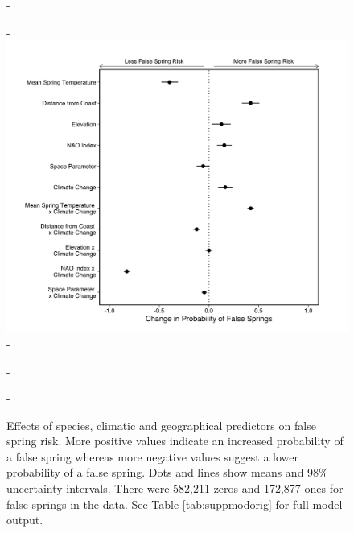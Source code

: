 \documentclass{article}\usepackage[]{graphicx}\usepackage[]{color}
\begin{document}
  
{\begin{figure} [H]
  -\begin{center}
  -\includegraphics[width=12cm]{..//analyses/figures/model_output_98_orig.png}
  -\caption{Effects of species, climatic and geographical predictors on false spring risk. More positive values indicate an increased probability of a false spring whereas more negative values suggest a lower probability of a false spring. Dots and lines show means and 98\% uncertainty intervals. There were 582,211 zeros and 172,877 ones for false springs in the data. See Table \ref{tab:suppmodorig} for full model output.}\label{fig:maineffects}
  -\end{center}
  -\end{figure}}
\end{document}
